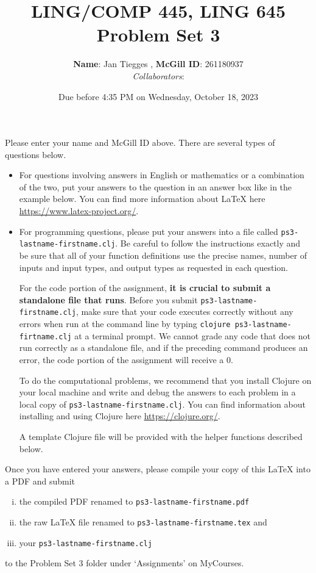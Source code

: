 \documentclass[10pt]{article}
\author{
  \textbf{Name}: Jan Tiegges       %
, \textbf{McGill ID}: 261180937 %
\\ \textit{Collaborators}:  %
}
\newcommand{\PSnum}{3}
\begin{document}
\title{LING/COMP 445, LING 645\\Problem Set \PSnum}
\date{Due before 4:35 PM on Wednesday, October 18, 2023}
\maketitle
Please enter your name and McGill ID above.
There are several types of questions below.
\begin{itemize}
\item
For questions involving answers in English or mathematics or a
combination of the two, put your answers to the question in an
answer box like in the example below. You can find more
information about \LaTeX{} here \url{https://www.latex-project.org/}.

\item For programming questions,
please put your answers into a file called
\texttt{ps\PSnum-lastname-firstname.clj}. Be careful to follow the instructions
exactly and be sure that all of your function definitions use the
precise names, number of inputs and input types, and output types as
requested in each question.

For the code portion of the assignment, \textbf{it is crucial to submit a
standalone file that runs}. Before you submit \texttt{ps\PSnum-lastname-firstname.clj},
make sure that your code executes correctly without any errors
when run at the command line by typing
\texttt{clojure ps\PSnum-lastname-firtname.clj} at a terminal
prompt. We cannot grade any code that does not run correctly as a
standalone file, and if the preceding command produces an error,
the code portion of the assignment will receive a $0$.

To do the computational problems, we recommend that you install
Clojure on your local machine and write and debug the answers to each
problem in a local copy of \texttt{ps\PSnum-lastname-firstname.clj}. You can
find information about installing and using Clojure here
\url{https://clojure.org/}.

A template Clojure file will be provided with the helper
functions described below.
\end{itemize}
Once you have entered your answers, please compile your copy of this
\LaTeX{} into a PDF and submit
\begin{enumerate}[(i),noitemsep]
\item
the compiled PDF renamed to
\texttt{ps\PSnum-lastname-firstname.pdf}
\item
the raw \LaTeX{} file renamed to
\texttt{ps\PSnum-lastname-firstname.tex} and
\item
your \texttt{ps\PSnum-lastname-firstname.clj}
\end{enumerate}
to the Problem Set \PSnum{} folder under `Assignments' on MyCourses.
\end{document}
